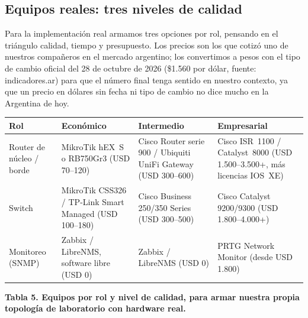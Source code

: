 \documentclass[11pt,a4paper]{article}
\newcommand{\figcaption}[1]{\par\noindent\footnotesize\textbf{#1}\par\vspace{0.4cm}}
\begin{document}
\subsection*{Equipos reales: tres niveles de calidad}

Para la implementaci\'on real armamos tres opciones por rol, pensando en el tri\'angulo calidad, tiempo y presupuesto. Los precios son los que cotiz\'o uno de nuestros compa\~neros en el mercado argentino; los convertimos a pesos con el tipo de cambio oficial del 28 de octubre de 2026 (\$1.560 por d\'olar, fuente: indicadores.ar) para que el n\'umero final tenga sentido en nuestro contexto, ya que un precio en d\'olares sin fecha ni tipo de cambio no dice mucho en la Argentina de hoy.

\needspace{1cm}
\begin{center}
\begin{minipage}{0.96\linewidth}
\centering
\small
\begin{tabular}{@{}p{2.3cm}p{3.65cm}p{3.65cm}p{3.65cm}@{}}
\toprule
\textbf{Rol} & \textbf{Econ\'omico} & \textbf{Intermedio} & \textbf{Empresarial} \\
\midrule
Router de n\'ucleo / borde & MikroTik hEX~S o RB750Gr3 (USD 70--120) & Cisco Router serie 900 / Ubiquiti UniFi Gateway (USD 300--600) & Cisco ISR~1100 / Catalyst~8000 (USD 1.500--3.500+, m\'as licencias IOS~XE) \\
Switch & MikroTik CSS326 / TP-Link Smart Managed (USD 100--180) & Cisco Business 250/350 Series (USD 300--500) & Cisco Catalyst 9200/9300 (USD 1.800--4.000+) \\
Monitoreo (SNMP) & Zabbix / LibreNMS, software libre (USD 0) & Zabbix / LibreNMS (USD 0) & PRTG Network Monitor (desde USD 1.800) \\
\bottomrule
\end{tabular}
\par\vspace{0.1cm}
\figcaption{Tabla 5. Equipos por rol y nivel de calidad, para armar nuestra propia topolog\'ia de laboratorio con hardware real.}
\end{minipage}
\end{center}
\end{document}
